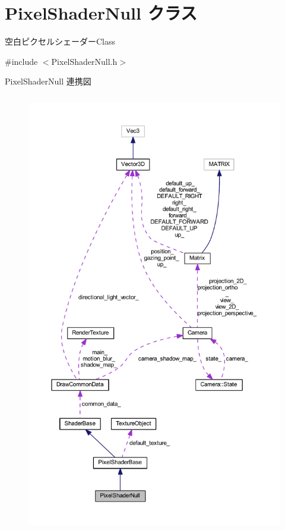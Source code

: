 \hypertarget{class_pixel_shader_null}{}\section{Pixel\+Shader\+Null クラス}
\label{class_pixel_shader_null}


空白ピクセルシェーダー\+Class  




{\ttfamily \#include $<$Pixel\+Shader\+Null.\+h$>$}



Pixel\+Shader\+Null 連携図\nopagebreak
\begin{figure}[H]
\begin{center}
\leavevmode
\includegraphics[height=550pt]{class_pixel_shader_null__coll__graph}
\end{center}
\end{figure}
